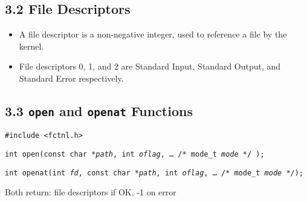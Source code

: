 \documentclass[]{article} \usepackage[all]{xy}
\newcommand{\code}{\texttt}
\begin{document}
\subsection*{3.2 File Descriptors}
\begin{itemize}
\item A file descriptor is a non-negative integer, used to reference a file by
the kernel.
\item File descriptors 0, 1, and 2 are Standard Input, Standard Output, and
Standard Error respectively.
\end{itemize}

\subsection*{3.3 \code{open} and \code{openat} Functions}
\code{\#include <fctnl.h>}

\code{int open(const char *\emph{path}, int \emph{oflag}, \ldots \,/* mode\_t
\emph{mode} */ );}

\code{int openat(int \emph{fd}, const char *\emph{path}, int \emph{oflag},
\ldots\,/* mode\_t \emph{mode} */);}

Both return: file descriptors if OK, -1 on error
\end{document}
